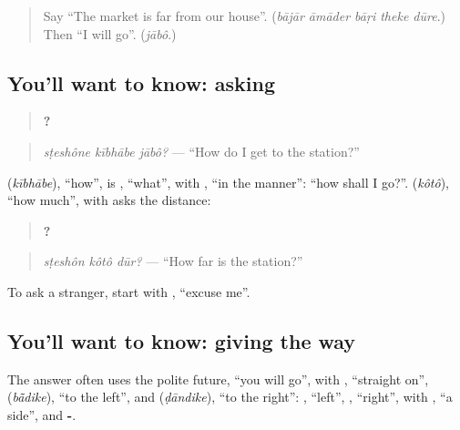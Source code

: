 \label{lesson:BN-C270-kibhabe-jabo}



\begin{quote}
Say \textquotedblleft{}The market is far from our house\textquotedblright{}. (\emph{bājār āmāder bāṛi theke dūre}.) Then \textquotedblleft{}I will go\textquotedblright{}. (\emph{jābô}.)
\end{quote}

\subsection*{You'll want to know: asking}
\begin{quote}
\textbf{  ?}
\end{quote}

\begin{quote}
\emph{sṭeshône kībhābe jābô?} — \textquotedblleft{}How do I get to the station?\textquotedblright{}
\end{quote}

\textbf{} (\emph{kībhābe}), \textquotedblleft{}how\textquotedblright{}, is \textbf{}, \textquotedblleft{}what\textquotedblright{}, with \textbf{}, \textquotedblleft{}in the manner\textquotedblright{}: \textquotedblleft{}how shall I go?\textquotedblright{}. \textbf{} (\emph{kôtô}), \textquotedblleft{}how much\textquotedblright{}, with \textbf{} asks the distance:

\begin{quote}
\textbf{  ?}
\end{quote}

\begin{quote}
\emph{sṭeshôn kôtô dūr?} — \textquotedblleft{}How far is the station?\textquotedblright{}
\end{quote}

To ask a stranger, start with \textbf{ }, \textquotedblleft{}excuse me\textquotedblright{}.

\subsection*{You'll want to know: giving the way}
The answer often uses the polite future, \textquotedblleft{}you will go\textquotedblright{}, with \textbf{}, \textquotedblleft{}straight on\textquotedblright{}, \textbf{} (\emph{bā̃dike}), \textquotedblleft{}to the left\textquotedblright{}, and \textbf{} (\emph{ḍāndike}), \textquotedblleft{}to the right\textquotedblright{}: \textbf{}, \textquotedblleft{}left\textquotedblright{}, \textbf{}, \textquotedblleft{}right\textquotedblright{}, with \textbf{}, \textquotedblleft{}a side\textquotedblright{}, and \textbf{-}.

